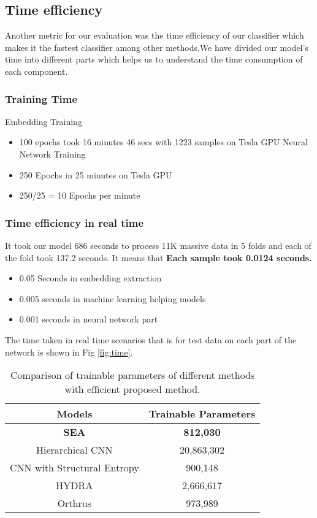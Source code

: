 \documentclass[conference]{IEEEtran}
\begin{document}
{{\subsection{Time efficiency}
Another metric for our evaluation was the time efficiency of our classifier which makes it the fastest classifier among other methods.We have divided our model’s time into different parts which helps us to understand the time consumption of each component.
\subsubsection{Training Time}
Embedding Training
\begin{itemize}
    \item 100 epochs took 16 minutes 46 secs with 1223 samples on Tesla GPU Neural Network Training
    \item 250 Epochs in 25 minutes on Tesla GPU
    \item 250/25 = 10 Epochs per minute
\end{itemize}
\subsubsection{Time efficiency in real time}
It took our model 686 seconds to process 11K massive data in 5 folds and each of the fold took 137.2 seconds. It means that \textbf{Each sample took 0.0124 seconds.}\\
\begin{itemize}
    \item 0.05 Seconds in embedding extraction
    \item 0.005 seconds in machine learning helping models
    \item 0.001 seconds in neural network part
\end{itemize}
The time taken in real time scenarios that is for test data on each part of the network is shown in Fig \ref{fig:time}.

\begin{table*}[htbp]
\caption{Comparison of trainable parameters of different methods with efficient proposed method.}
\begin{center}
\begin{tabular}{|c|c|}
\hline
\textbf{Models}&{\textbf{Trainable Parameters}} \\

\hline
\textbf{SEA} &\textbf{812,030}  \\
\hline
\hline
Hierarchical CNN \cite{b5}&20,863,302   \\
\hline
\hline
CNN with Structural Entropy \cite{b6} &900,148 \\ 
\hline
\hline
HYDRA \cite{b3}&2,666,617  \\
\hline
\hline
Orthrus \cite{b4}&973,989  \\
\hline
\hline


\end{tabular}
\end{center}
\end{table*}}}
\end{document}
